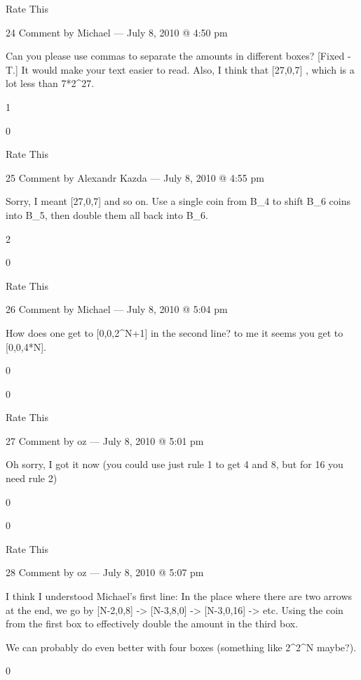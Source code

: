     Rate This

    24 Comment by Michael — July 8, 2010 @ 4:50 pm

        Can you please use commas to separate the amounts in different
        boxes? [Fixed - T.] It would make your text easier to
        read. Also, I think that [27,0,7] \mapsto [0,0,7+4*27], which
        is a lot less than 7*2^{27}.
         
        1
         
        0
         
        Rate This

        25 Comment by Alexandr Kazda — July 8, 2010 @ 4:55 pm

            Sorry, I meant [27,0,7] \to [26,7,0] \to [26,0,14] \to [25,14,0] \to [25,0,28] and so on. Use a single coin from B_4 to shift B_6 coins into B_5, then double them all back into B_6.
             
            2
             
            0
             
            Rate This

            26 Comment by Michael — July 8, 2010 @ 5:04 pm

        How does one get to [0,0,2^{N+1}] in the second line? to me it seems you get to [0,0,4*N].
         
        0
         
        0
         
        Rate This

        27 Comment by oz — July 8, 2010 @ 5:01 pm

            Oh sorry, I got it now (you could use just rule 1 to get 4 and 8, but for 16 you need rule 2)
             
            0
             
            0
             
            Rate This

            28 Comment by oz — July 8, 2010 @ 5:07 pm

            I think I understood Michael’s first line: In the place where there are two arrows at the end, we go by [N-2,0,8] -> [N-3,8,0] -> [N-3,0,16] -> etc. Using the coin from the first box to effectively double the amount in the third box.

            We can probably do even better with four boxes (something like 2^{2^N} maybe?).
             
            0
             
